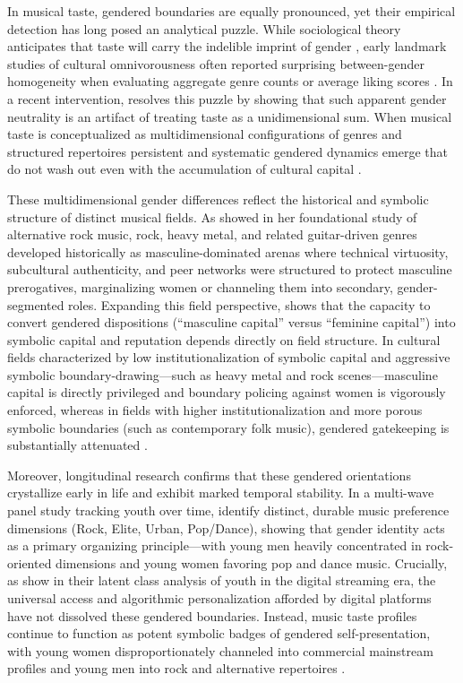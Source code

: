 \documentclass[12pt]{article}
\begin{document}
In musical taste, gendered boundaries are equally pronounced, yet their empirical detection has long posed an analytical puzzle. While sociological theory anticipates that taste will carry the indelible imprint of gender \citep{bourdieu1984distinction,lizardo2006puzzle}, early landmark studies of cultural omnivorousness often reported surprising between-gender homogeneity when evaluating aggregate genre counts or average liking scores \citep{peterson1996changing-967,bryson1996anything-311}. In a recent intervention, \citet{ma2026deep} resolves this puzzle by showing that such apparent gender neutrality is an artifact of treating taste as a unidimensional sum. When musical taste is conceptualized as multidimensional configurations of genres and structured repertoires persistent and systematic gendered dynamics emerge that do not wash out even with the accumulation of cultural capital \citep{ma2026deep}.

These multidimensional gender differences reflect the historical and symbolic structure of distinct musical fields. As \citet{clawson1999when} showed in her foundational study of alternative rock music, rock, heavy metal, and related guitar-driven genres developed historically as masculine-dominated arenas where technical virtuosity, subcultural authenticity, and peer networks were structured to protect masculine prerogatives, marginalizing women or channeling them into secondary, gender-segmented roles. Expanding this field perspective, \citet{miller2014symbolic} shows that the capacity to convert gendered dispositions (``masculine capital'' versus ``feminine capital'') into symbolic capital and reputation depends directly on field structure. In cultural fields characterized by low institutionalization of symbolic capital and aggressive symbolic boundary-drawing—such as heavy metal and rock scenes—masculine capital is directly privileged and boundary policing against women is vigorously enforced, whereas in fields with higher institutionalization and more porous symbolic boundaries (such as contemporary folk music), gendered gatekeeping is substantially attenuated \citep{miller2014symbolic}.

Moreover, longitudinal research confirms that these gendered orientations crystallize early in life and exhibit marked temporal stability. In a multi-wave panel study tracking youth over time, \citet{delsing2008adolescents} identify distinct, durable music preference dimensions (Rock, Elite, Urban, Pop/Dance), showing that gender identity acts as a primary organizing principle—with young men heavily concentrated in rock-oriented dimensions and young women favoring pop and dance music. Crucially, as \citet{carbone2024adolescents} show in their latent class analysis of youth in the digital streaming era, the universal access and algorithmic personalization afforded by digital platforms have not dissolved these gendered boundaries. Instead, music taste profiles continue to function as potent symbolic badges of gendered self-presentation, with young women disproportionately channeled into commercial mainstream profiles and young men into rock and alternative repertoires \citep{carbone2024adolescents}.
\end{document}
